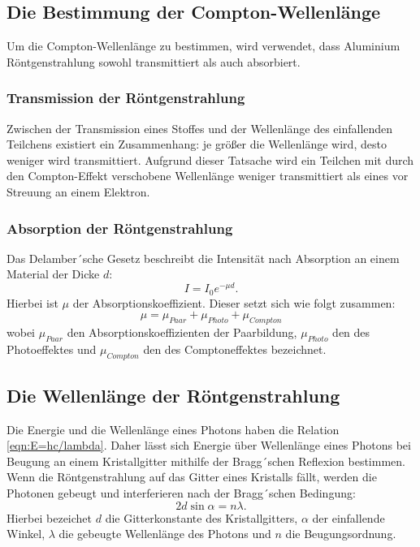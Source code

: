 \subsection{Die Bestimmung der Compton-Wellenlänge}
\label{sec:comptonwellenlänge}
Um die Compton-Wellenlänge zu bestimmen, wird verwendet, dass Aluminium Röntgenstrahlung sowohl transmittiert als auch absorbiert.
\subsubsection{Transmission der Röntgenstrahlung}
Zwischen der Transmission eines Stoffes und der Wellenlänge des einfallenden
Teilchens existiert ein Zusammenhang: je größer die Wellenlänge wird, desto weniger wird transmittiert. Aufgrund dieser Tatsache wird ein Teilchen mit durch den Compton-Effekt verschobene Wellenlänge weniger
transmittiert als eines vor Streuung an einem Elektron.

\subsubsection{Absorption der Röntgenstrahlung}
Das Delamber´sche Gesetz beschreibt die Intensität nach Absorption an einem Material der Dicke $d$:
\begin{equation}
	I = I_0 e^{- \mu d}.
	\label{eqn:intensitätabsorp}
\end{equation}
Hierbei ist $\mu$ der Absorptionskoeffizient. Dieser setzt sich wie folgt zusammen:
\begin{equation*}
	\mu = \mu_{Paar} + \mu_{Photo} + \mu_{Compton}
\end{equation*}
wobei $\mu_{Paar}$ den Absorptionskoeffizienten der Paarbildung, $\mu_{Photo}$ den des Photoeffektes und $\mu_{Compton}$ den des Comptoneffektes bezeichnet.

\subsection{Die Wellenlänge der Röntgenstrahlung}
Die Energie und die Wellenlänge eines Photons haben die Relation \eqref{eqn:E=hc/lambda}. Daher lässt sich Energie über Wellenlänge eines Photons bei Beugung an einem Kristallgitter mithilfe der
Bragg´schen Reflexion bestimmen. Wenn die Röntgenstrahlung auf das Gitter eines Kristalls fällt, werden die Photonen gebeugt und interferieren nach der Bragg´schen Bedingung:
\begin{equation}
	2 d \sin \alpha = n \lambda.
	\label{eqn:(3)}
\end{equation}
Hierbei bezeichet $d$ die Gitterkonstante des Kristallgitters, $\alpha$ der einfallende Winkel, $\lambda$ die gebeugte Wellenlänge des Photons und $n$ die Beugungsordnung.

